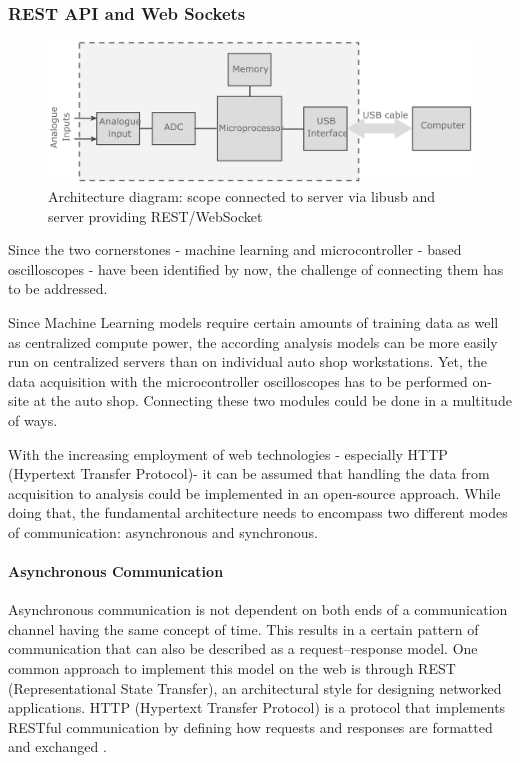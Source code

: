 \subsubsection{REST API and Web Sockets}
\begin{figure}[ht]
  \centering
  \includegraphics[width=0.8\linewidth]{figures/data_server_architecture.png}
  \caption{Architecture diagram: scope connected to server via libusb and server providing REST/WebSocket}
  \label{fig:data-server}
\end{figure}
Since the two cornerstones - machine learning and microcontroller - based oscilloscopes - have been identified by now, the challenge of connecting them has to be addressed.

Since Machine Learning models require certain amounts of training data as well as centralized compute power, 
the according analysis models can be more easily run on centralized servers than on individual auto shop workstations. 
Yet, the data acquisition with the microcontroller oscilloscopes has to be performed on-site at the auto shop. 
Connecting these two modules could be done in a multitude of ways.

With the increasing employment of web technologies - especially HTTP (Hypertext Transfer Protocol)- it can be assumed that handling the data from acquisition to analysis could be implemented in an open-source approach. 
While doing that, the fundamental architecture needs to encompass two different modes of communication: asynchronous and synchronous.

\paragraph{Asynchronous Communication}
Asynchronous communication is not dependent on both ends of a communication channel having the same concept of time. 
This results in a certain pattern of communication that can also be described as a request–response model. 
One common approach to implement this model on the web is through REST (Representational State Transfer), an architectural style for designing networked applications. 
HTTP (Hypertext Transfer Protocol) is a protocol that implements RESTful communication by defining how requests and responses are formatted and exchanged \cite{Fielding2000}.

